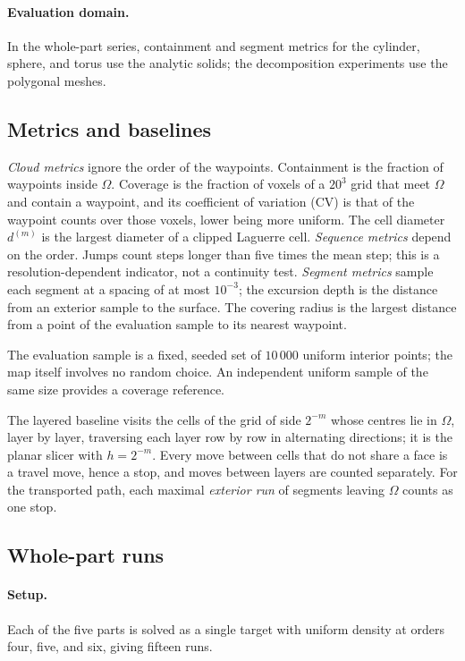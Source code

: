 \paragraph{Evaluation domain.}
In the whole-part series, containment and segment metrics for the cylinder, sphere, and torus use the analytic solids; the decomposition experiments use the polygonal meshes.

\subsection{Metrics and baselines}
\label{sec:experiments-setup}

\emph{Cloud metrics} ignore the order of the waypoints. Containment is the fraction of waypoints inside $\Omega$. Coverage is the fraction of voxels of a $20^3$ grid that meet $\Omega$ and contain a waypoint, and its coefficient of variation (CV) is that of the waypoint counts over those voxels, lower being more uniform. The cell diameter $d^{(m)}$ is the largest diameter of a clipped Laguerre cell. \emph{Sequence metrics} depend on the order. Jumps count steps longer than five times the mean step; this is a resolution-dependent indicator, not a continuity test. \emph{Segment metrics} sample each segment at a spacing of at most $10^{-3}$; the excursion depth is the distance from an exterior sample to the surface. The covering radius is the largest distance from a point of the evaluation sample to its nearest waypoint.

The evaluation sample is a fixed, seeded set of $10\,000$ uniform interior points; the map itself involves no random choice. An independent uniform sample of the same size provides a coverage reference.

The layered baseline visits the cells of the grid of side $2^{-m}$ whose centres lie in $\Omega$, layer by layer, traversing each layer row by row in alternating directions; it is the planar slicer with $h=2^{-m}$. Every move between cells that do not share a face is a travel move, hence a stop, and moves between layers are counted separately. For the transported path, each maximal \emph{exterior run} of segments leaving $\Omega$ counts as one stop.

\subsection{Whole-part runs}
\label{sec:experiments-geometries}

\paragraph{Setup.}
Each of the five parts is solved as a single target with uniform density at orders four, five, and six, giving fifteen runs.

